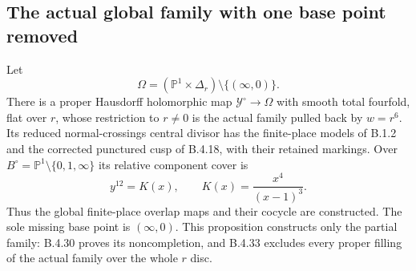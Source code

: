 \subsection{The actual global family with one base point removed}

\begin{proposition}
\label{push:B419}
Let
\[
 \Omega=(\mathbb P^1\times\Delta_r)
                  \setminus\{(\infty,0)\}.
\]
There is a proper Hausdorff holomorphic map
$\mathcal Y^\circ\to\Omega$ with smooth total fourfold,
flat over $r$, whose restriction to $r\ne0$ is the
actual family pulled back by $w=r^6$. Its reduced
normal-crossings central divisor has the finite-place
models of B.1.2 and the corrected punctured cusp of
B.4.18, with their retained markings. Over
$B^\circ=\mathbb P^1\setminus\{0,1,\infty\}$ its
relative component cover is
\[
 y^{12}=K(x),\qquad K(x)=\frac{x^4}{(x-1)^3}.
\]
Thus the global finite-place overlap maps and their
cocycle are constructed. The sole missing base point
is $(\infty,0)$. This proposition constructs only the
partial family: B.4.30 proves its noncompletion, and
B.4.33 excludes every proper filling of the actual
family over the whole $r$ disc.
\end{proposition}

